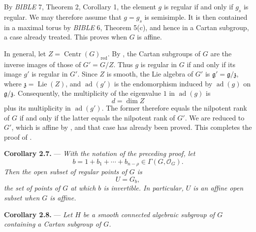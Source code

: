 By \emph{BIBLE} 7, Theorem 2, Corollary 1, the element \(g\) is
regular if and only if \(g_s\) is regular. We may therefore assume
that \(g=g_s\) is semisimple. It is then contained in a maximal torus
by \emph{BIBLE} 6, Theorem 5(c), and hence in a Cartan subgroup, a
case already treated. This proves  when \(G\) is affine.

In general, let \(Z=\operatorname{Centr}(G)_{\mathrm{red}}\). By
, the Cartan subgroups of \(G\) are the inverse images of
those of \(G'=G/Z\). Thus \(g\) is regular in \(G\) if and only if
its image \(g'\) is regular in \(G'\). Since \(Z\) is smooth, the Lie
algebra of \(G'\) is
\(\mathfrak g'=\mathfrak g/\mathfrak z\), where
\(\mathfrak z=\operatorname{Lie}(Z)\), and
\(\operatorname{ad}(g')\) is the endomorphism induced by
\(\operatorname{ad}(g)\) on \(\mathfrak g/\mathfrak z\).
Consequently, the multiplicity of the eigenvalue \(1\) in
\(\operatorname{ad}(g)\) is
\[
  d=\dim Z
\]
plus its multiplicity in \(\operatorname{ad}(g')\). The former
therefore equals the nilpotent rank of \(G\) if and only if the latter
equals the nilpotent rank of \(G'\). We are reduced to \(G'\), which
is affine by , and that case has already been proved. This
completes the proof of .

\medskip
\noindent{}\textbf{Corollary 2.7.} ---
\textit{With the notation of the preceding proof, let}
\[
  b=1+b_1+\cdots+b_{n-\rho}\in\Gamma(G,\mathcal O_G).
\]
\textit{Then the open subset of regular points of \(G\) is}
\[
  U=G_b,
\]
\textit{the set of points of \(G\) at which \(b\) is invertible. In
particular, \(U\) is an affine open subset when \(G\) is affine.}

\medskip
\noindent{}\textbf{Corollary 2.8.} ---
\textit{Let \(H\) be a smooth connected algebraic subgroup of \(G\)
containing a Cartan subgroup of \(G\).}

